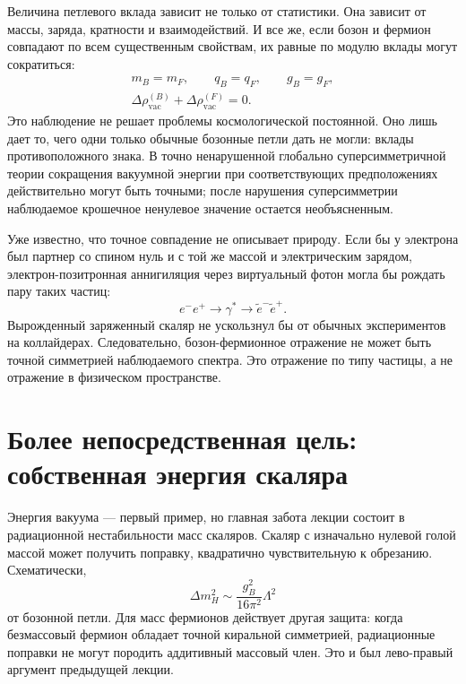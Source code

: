Величина петлевого вклада зависит не только от статистики. Она зависит от массы, заряда, кратности и взаимодействий. И все же, если бозон и фермион совпадают по всем существенным свойствам, их равные по модулю вклады могут сократиться:
\begin{equation}
\begin{gathered}
m_B=m_F,\qquad q_B=q_F,\qquad g_B=g_F,\\
\Delta\rho_{\mathrm{vac}}^{(B)}
+\Delta\rho_{\mathrm{vac}}^{(F)}=0.
\end{gathered}
\end{equation}
Это наблюдение не решает проблемы космологической постоянной. Оно лишь дает то, чего одни только обычные бозонные петли дать не могли: вклады противоположного знака. В точно ненарушенной глобально суперсимметричной теории сокращения вакуумной энергии при соответствующих предположениях действительно могут быть точными; после нарушения суперсимметрии наблюдаемое крошечное ненулевое значение остается необъясненным.

Уже известно, что точное совпадение не описывает природу. Если бы у электрона был партнер со спином нуль и с той же массой и электрическим зарядом, электрон-позитронная аннигиляция через виртуальный фотон могла бы рождать пару таких частиц:
\begin{equation}
e^-e^+\longrightarrow\gamma^*
\longrightarrow\widetilde e^-\widetilde e^+.
\end{equation}
Вырожденный заряженный скаляр не ускользнул бы от обычных экспериментов на коллайдерах. Следовательно, бозон-фермионное отражение не может быть точной симметрией наблюдаемого спектра. Это отражение по типу частицы, а не отражение в физическом пространстве.

\section{Более непосредственная цель: собственная энергия скаляра}

Энергия вакуума — первый пример, но главная забота лекции состоит в радиационной нестабильности масс скаляров. Скаляр с изначально нулевой голой массой может получить поправку, квадратично чувствительную к обрезанию. Схематически,
\begin{equation}
\Delta m_H^2\sim \frac{g_B^2}{16\pi^2}\Lambda^2
\end{equation}
от бозонной петли. Для масс фермионов действует другая защита: когда безмассовый фермион обладает точной киральной симметрией, радиационные поправки не могут породить аддитивный массовый член. Это и был лево-правый аргумент предыдущей лекции.

